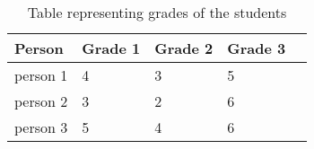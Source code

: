 \begin{table}[h]
\centering
\begin{tabular}{lllll}
\hline
Person   & Grade 1 & Grade 2 & Grade 3 &  \\ \hline
person 1 & 4       & 3       & 5       &  \\
person 2 & 3       & 2       & 6       &  \\
person 3  & 5       & 4       & 6       &  \\ \hline
\end{tabular}
\label{tab:grades}
\caption{Table representing grades of the students}
\end{table}